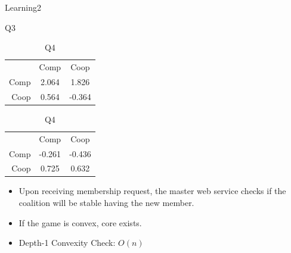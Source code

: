 \documentclass{beamer}
\begin{document}
\begin{frame}{Learning2}
    \begin{table}[!htb]
        \begin{minipage}{.5\linewidth}
          \caption{Q3}
          \centering
            \begin{tabular}{ r|c|c| }
                \multicolumn{1}{r}{}
                 &  \multicolumn{1}{c}{Comp}
                 & \multicolumn{1}{c}{Coop} \\
                \cline{2-3}
                Comp & 2.064 & 1.826 \\
                \cline{2-3}
                Coop & 0.564 & -0.364 \\
                \cline{2-3}
            \end{tabular}
        \end{minipage}%
        \begin{minipage}{.5\linewidth}
          \centering
            \caption{Q4}
            \begin{tabular}{ r|c|c| }
                \multicolumn{1}{r}{}
                 &  \multicolumn{1}{c}{Comp}
                 & \multicolumn{1}{c}{Coop} \\
                \cline{2-3}
                Comp & -0.261 & -0.436 \\
                \cline{2-3}
                Coop & 0.725 & 0.632 \\
                \cline{2-3}
            \end{tabular}
        \end{minipage}
    \end{table}


    \begin{itemize}
        \item Upon receiving membership request, the master web service checks if the coalition will be stable having the new member.
        \item If the game is convex, core exists.
        \item Depth-1 Convexity Check: $O(n)$
    \end{itemize}

\end{frame}
\end{document}
